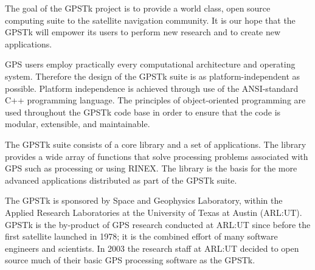 \begin{titlepage}
The goal of the GPSTk project is to provide a world class, open source computing suite to the satellite navigation community. It is our hope that the GPSTk will empower its users to perform new research and to create new applications.

GPS users employ practically every computational architecture and operating system. Therefore the design of the GPSTk suite is as platform-independent as possible. Platform independence is achieved through use of the ANSI-standard C++ programming language. The principles of object-oriented programming are used throughout the GPSTk code base in order to ensure that the code is modular, extensible, and maintainable.

The GPSTk suite consists of a core library and a set of applications. The library provides a wide array of functions that solve processing problems associated with GPS such as processing or using RINEX. The library is the basis for the more advanced applications distributed as part of the GPSTk suite.

The GPSTk is sponsored by Space and Geophysics Laboratory, within the Applied Research Laboratories at the University of Texas at Austin (ARL:UT). GPSTk is the by-product of GPS research conducted at ARL:UT since before the first satellite launched in 1978; it is the combined effort of many software engineers and scientists. In 2003 the research staff at ARL:UT decided to open source much of their basic GPS processing software as the GPSTk.
\end{titlepage}
